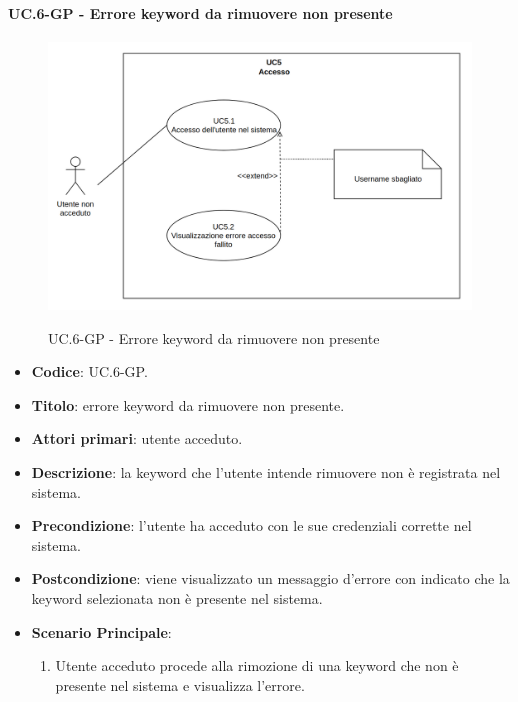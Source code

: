 		\paragraph{UC\theuccount.6-GP - Errore keyword da rimuovere non presente}
		\begin{figure}[H]
			\centering
			\includegraphics[width=\columnwidth]{img/UC5.png}\\
			\caption{UC\theuccount.6-GP - Errore keyword da rimuovere non presente}
		\end{figure}
		\begin{itemize}
			\item \textbf{Codice}: UC\theuccount.6-GP.
			\item \textbf{Titolo}: errore keyword da rimuovere non presente.
			\item \textbf{Attori primari}: utente acceduto.
			\item \textbf{Descrizione}: la keyword che l'utente intende rimuovere non è registrata nel sistema.
			\item \textbf{Precondizione}: l’utente ha acceduto con le sue credenziali corrette nel sistema.
			\item \textbf{Postcondizione}: viene visualizzato un messaggio d'errore con indicato che la keyword
			selezionata non è presente nel sistema.
			\item \textbf{Scenario Principale}:
			\begin{enumerate}
				\item Utente acceduto procede alla rimozione di una keyword che non è presente nel sistema e
				visualizza l'errore.
			\end{enumerate}
		\end{itemize}
		